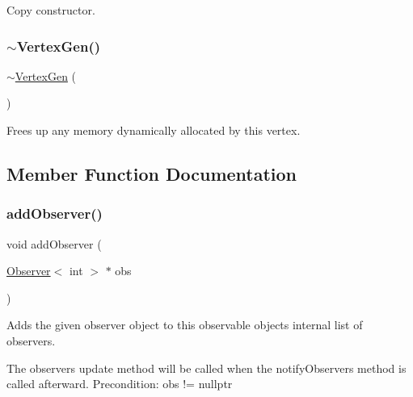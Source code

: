 Copy constructor. 

\mbox{\label{classVertexGen_a7e615c7ee4f1a16998cd37bfbf0071b3}} 
\subsubsection{\texorpdfstring{$\sim$\+Vertex\+Gen()}{~VertexGen()}}
{\footnotesize\ttfamily $\sim$\mbox{\hyperlink{classVertexGen}{Vertex\+Gen}} (\begin{DoxyParamCaption}{ }\end{DoxyParamCaption})}



Frees up any memory dynamically allocated by this vertex. 



\subsection{Member Function Documentation}
\mbox{\label{classObservable_a7fa6df797eb4680c2776371f2937a1b2}} 
\subsubsection{\texorpdfstring{add\+Observer()}{addObserver()}\hspace{0.1cm}{\footnotesize\ttfamily [1/2]}}
{\footnotesize\ttfamily void add\+Observer (\begin{DoxyParamCaption}\item[{\mbox{\hyperlink{classObserver}{Observer}}$<$ int  $>$ $\ast$}]{obs }\end{DoxyParamCaption})\hspace{0.3cm}{\ttfamily [inherited]}}



Adds the given observer object to this observable object\textquotesingle{}s internal list of observers. 

The observer\textquotesingle{}s update method will be called when the notify\+Observers method is called afterward. Precondition\+: obs != nullptr \mbox{\label{classObservable_a49fbc8dd9a3300429f7f575dc7ba0be8}} 
